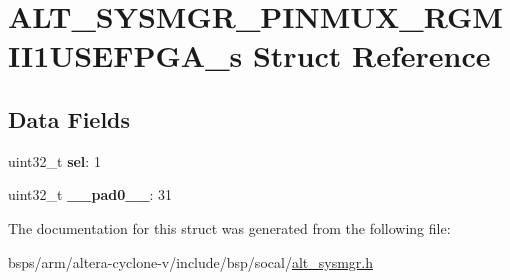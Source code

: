 \hypertarget{structALT__SYSMGR__PINMUX__RGMII1USEFPGA__s}{}\section{A\+L\+T\+\_\+\+S\+Y\+S\+M\+G\+R\+\_\+\+P\+I\+N\+M\+U\+X\+\_\+\+R\+G\+M\+I\+I1\+U\+S\+E\+F\+P\+G\+A\+\_\+s Struct Reference}
\label{structALT__SYSMGR__PINMUX__RGMII1USEFPGA__s}
\subsection*{Data Fields}
\begin{DoxyCompactItemize}
\item 
\mbox{\label{structALT__SYSMGR__PINMUX__RGMII1USEFPGA__s_ab1b1e655c49209fc9114ad8fa357d5d4}} 
uint32\+\_\+t {\bfseries sel}\+: 1
\item 
\mbox{\label{structALT__SYSMGR__PINMUX__RGMII1USEFPGA__s_a0a887fe9d831161a195fdec7c4c9bdb8}} 
uint32\+\_\+t {\bfseries \+\_\+\+\_\+pad0\+\_\+\+\_\+}\+: 31
\end{DoxyCompactItemize}


The documentation for this struct was generated from the following file\+:\begin{DoxyCompactItemize}
\item 
bsps/arm/altera-\/cyclone-\/v/include/bsp/socal/\mbox{\hyperlink{alt__sysmgr_8h}{alt\+\_\+sysmgr.\+h}}\end{DoxyCompactItemize}
